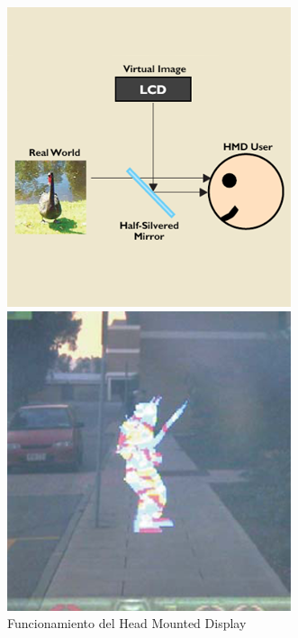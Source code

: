 \begin{figure}[ht]
    \centering
    \begin{minipage}{0.32\textwidth}
        \centering
        \includegraphics[width=\linewidth]{Images/ARQuake_HIW.png}
        \caption{Funcionamiento del Head Mounted Display}
    \label{fig:Grafico_HeadMounted}
    \end{minipage}\hfill
    \begin{minipage}{0.32\textwidth}
        \centering
        \includegraphics[width=\linewidth]{Images/ARQuake_Example.png}

\end{minipage}
\end{figure}
